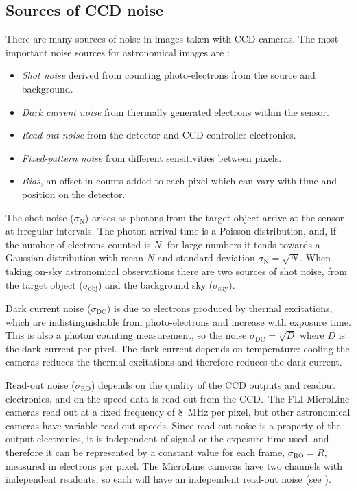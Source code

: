 \subsection{Sources of CCD noise}
\label{sec:noise}
\begin{colsection}

There are many sources of noise in images taken with CCD cameras. The most important noise sources for astronomical images are \citep{CCDs}:
%
\begin{itemize}
    \item \emph{Shot noise} derived from counting photo-electrons from the source and background.
    \item \emph{Dark current noise} from thermally generated electrons within the sensor.
    \item \emph{Read-out noise} from the detector and CCD controller electronics.
    \item \emph{Fixed-pattern noise} from different sensitivities between pixels.
    \item \emph{Bias}, an offset in counts added to each pixel which can vary with time and position on the detector.
\end{itemize}

The shot noise ($\sigma_\text{N}$) arises as photons from the target object arrive at the sensor at irregular intervals. The photon arrival time is a Poisson distribution, and, if the number of electrons counted is $N$, for large numbers it tends towards a Gaussian distribution with mean $N$ and standard deviation $\sigma_\text{N} = \sqrt{N}$. When taking on-sky astronomical observations there are two sources of shot noise, from the target object ($\sigma_\text{obj}$) and the background sky ($\sigma_\text{sky}$).

Dark current noise ($\sigma_\text{DC}$) is due to electrons produced by thermal excitations, which are indistinguishable from photo-electrons and increase with exposure time. This is also a photon counting measurement, so the noise $\sigma_\text{DC} = \sqrt{D}$ where $D$ is the dark current per pixel. The dark current depends on temperature: cooling the cameras reduces the thermal excitations and therefore reduces the dark current.

Read-out noise ($\sigma_\text{RO}$) depends on the quality of the CCD outputs and readout electronics, and on the speed data is read out from the CCD.\ The FLI MicroLine cameras read out at a fixed frequency of \SI{8}{\mega\hertz} per pixel, but other astronomical cameras have variable read-out speeds. Since read-out noise is a property of the output electronics, it is independent of signal or the exposure time used, and therefore it can be represented by a constant value for each frame, $\sigma_\text{RO} = R$, measured in electrons per pixel. The MicroLine cameras have two channels with independent readouts, so each will have an independent read-out noise (see ).


\end{colsection}
